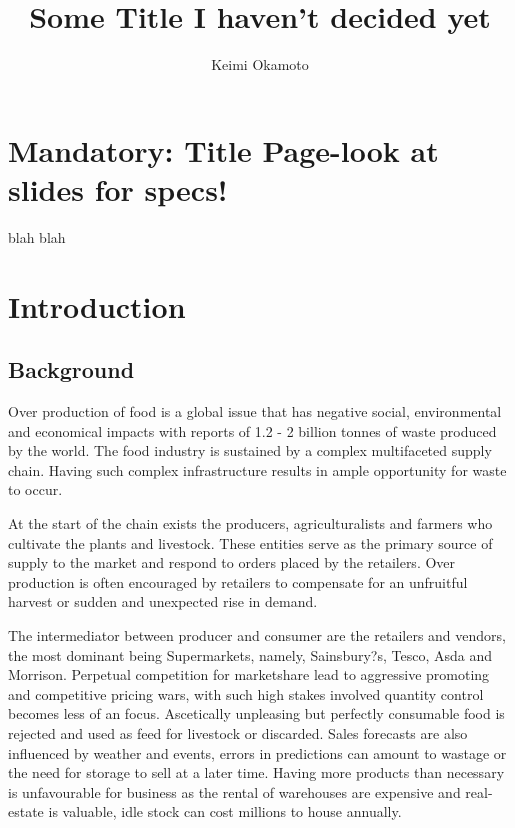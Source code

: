 \documentclass[a4paper, 11pt]{article}
\title{Some Title I haven't decided yet}
\author{Keimi Okamoto}
\begin{document}
\section{Mandatory: Title Page-look at slides for specs!}
\maketitle
\tableofcontents
\clearpage

blah blah
\clearpage

\section{Introduction}

\subsection{Background}
Over production of food is a global issue that has negative social, environmental and economical impacts with reports of 1.2 - 2 billion tonnes of waste produced by the world. The food industry is sustained by a complex multifaceted supply chain. Having such complex infrastructure results in ample opportunity for waste to occur. 

At the start of the chain exists the producers, agriculturalists and farmers who cultivate the plants and livestock. These entities serve as the primary source of supply to the market and respond to orders placed by the retailers. Over production is often encouraged by retailers to compensate for an unfruitful harvest or sudden and unexpected rise in demand. 

The intermediator between producer and consumer are the retailers and vendors, the most dominant being Supermarkets, namely, Sainsbury?s, Tesco, Asda and Morrison. Perpetual competition for marketshare lead to aggressive promoting and competitive pricing wars, with such high stakes involved quantity control becomes less of an focus. Ascetically unpleasing but perfectly consumable food is rejected and used as feed for livestock or discarded. Sales forecasts are also influenced by weather and events, errors in predictions can amount to wastage or the need for storage to sell at a later time. Having more products than necessary is unfavourable for business as the rental of warehouses are expensive and real-estate is valuable, idle stock can cost millions to house annually.
\end{document}
